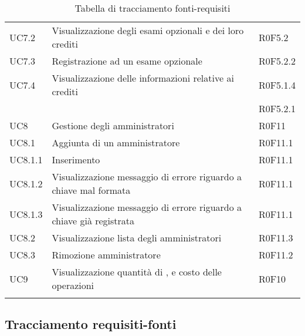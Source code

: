 \documentclass[AnalisiDeiRequisiti.tex]{subfiles}
\begin{document}
\begin{longtable}[H]{p{2cm}p{5cm}p{5cm}}
	UC7.2 & Visualizzazione degli esami opzionali e dei loro crediti & R0F5.2 \\  
	UC7.3 & Registrazione ad un esame opzionale & R0F5.2.2 \\  
	UC7.4 & Visualizzazione delle informazioni relative ai crediti & R0F5.1.4 \\ 
	& & R0F5.2.1 \\  
	UC8 & Gestione degli amministratori & R0F11 \\  
	UC8.1 & Aggiunta di un amministratore & R0F11.1 \\  
	UC8.1.1 & Inserimento \citGloss{chiave pubblica} & R0F11.1 \\  
	UC8.1.2 & Visualizzazione messaggio di errore riguardo a chiave mal formata & R0F11.1 \\  
	UC8.1.3 & Visualizzazione messaggio di errore riguardo a chiave già registrata & R0F11.1 \\  
	UC8.2 & Visualizzazione lista degli amministratori & R0F11.3 \\  
	UC8.3 & Rimozione amministratore & R0F11.2 \\  
	UC9 & Visualizzazione quantità di \citGloss{Gas}, \citGloss{Ether} e costo delle operazioni & R0F10 \\  
	\hiderowcolors
	\caption{Tabella di tracciamento fonti-requisiti}
\end{longtable}

\subsection{Tracciamento requisiti-fonti}
\end{document}
